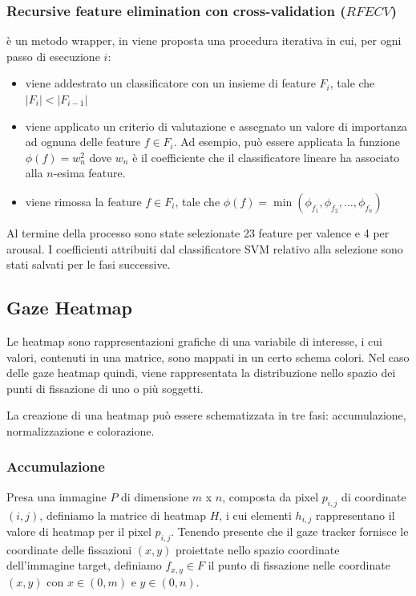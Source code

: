 \subsubsection*{Recursive feature elimination con cross-validation ($RFECV$)} è un metodo wrapper, in \cite{weston2001feature} viene proposta una procedura iterativa in cui, per ogni passo di esecuzione $i$:
\begin{itemize}
  \item viene addestrato un classificatore con un insieme di feature $F_{i}$, tale che $|F_{i}| < |F_{i-1}|$
  \item viene applicato un criterio di valutazione e assegnato un valore di importanza ad ognuna delle feature $f \in F_{i}$. Ad esempio, può essere applicata la funzione $\phi(f) = w_{n}^2$ dove $w_{n}$ è il coefficiente che il classificatore lineare ha associato alla $n$-esima feature.
  \item viene rimossa la feature $f \in F_{i}$, tale che $\phi(f) = \min(\phi_{f_1}, \phi_{f_2}, \dots, \phi_{f_n})$
\end{itemize}

Al termine della processo sono state selezionate 23 feature per valence e 4 per arousal. I coefficienti attribuiti dal classificatore SVM relativo alla selezione sono stati salvati per le fasi successive.

\subsection{Gaze Heatmap}

Le heatmap sono rappresentazioni grafiche di una variabile di interesse, i cui valori, contenuti in una matrice, sono mappati in un certo schema colori. Nel caso delle gaze heatmap quindi, viene rappresentata la distribuzione nello spazio dei punti di fissazione di uno o più soggetti.

La creazione di una heatmap può essere schematizzata in tre fasi: accumulazione, normalizzazione e colorazione.

\subsubsection*{Accumulazione}
Presa una immagine $P$ di dimensione $m$ x $n$, composta da pixel $p_{i,j}$ di coordinate $(i,j)$, definiamo la matrice di heatmap $H$, i cui elementi $h_{i,j}$ rappresentano il valore di heatmap per il pixel $p_{i,j}$. Tenendo presente che il gaze tracker fornisce le coordinate delle fissazioni $(x,y)$ proiettate nello spazio coordinate dell'immagine target, definiamo $f_{x,y} \in F$ il punto di fissazione nelle coordinate $(x,y)$ con $x \in (0,m)$ e $y \in (0,n)$.

